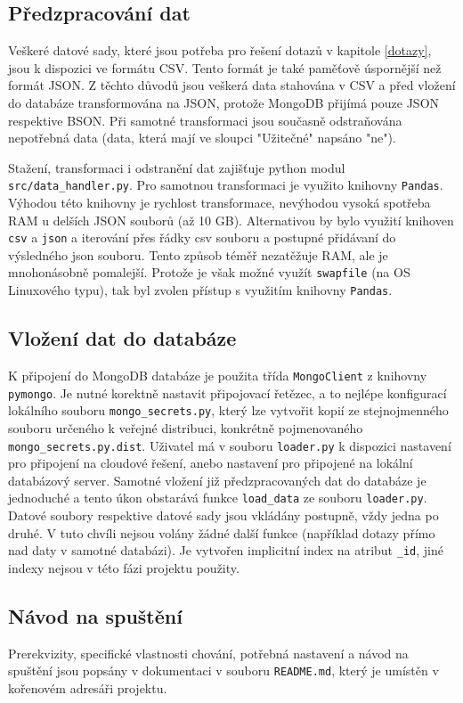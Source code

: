 \documentclass[12pt]{article}
\begin{document}
\subsection{Předzpracování dat}
\label{predzpracovani}
Veškeré datové sady, které jsou potřeba pro řešení dotazů v kapitole \ref{dotazy}, jsou k dispozici ve formátu CSV. Tento formát je také paměťově úspornější než formát JSON. Z těchto důvodů jsou veškerá data stahována v CSV a před vložení do databáze transformována na JSON, protože MongoDB přijímá pouze JSON respektive BSON. Při samotné transformaci jsou současně odstraňována nepotřebná data (data, která mají ve sloupci "Užitečné" napsáno "ne").

Stažení, transformaci i odstranění dat zajišťuje python modul \texttt{src/data\_handler.py}. Pro samotnou transformaci je využito knihovny \texttt{Pandas}. Výhodou této knihovny je rychlost transformace, nevýhodou vysoká spotřeba RAM u delších JSON souborů (až 10 GB). Alternativou by bylo využití knihoven \texttt{csv} a \texttt{json} a iterování přes řádky csv souboru a postupné přidávaní do výsledného json souboru. Tento způsob téměř nezatěžuje RAM, ale je mnohonásobně pomalejší. Protože je však možné využít \texttt{swapfile} (na OS Linuxového typu), tak byl zvolen přístup s využitím knihovny \texttt{Pandas}.

\subsection{Vložení dat do databáze}
K připojení do MongoDB databáze je použita třída \texttt{MongoClient} z knihovny \texttt{pymongo}. Je nutné korektně nastavit připojovací řetězec, a to nejlépe konfigurací lokálního souboru \texttt{mongo\_secrets.py}, který lze vytvořit kopií ze stejnojmenného souboru určeného k veřejné distribuci, konkrétně pojmenovaného \texttt{mongo\_secrets.py.dist}.
Uživatel má v souboru \texttt{loader.py} k dispozici nastavení pro připojení na cloudové řešení, anebo nastavení pro připojené na lokální databázový server.
Samotné vložení již předzpracovaných dat do databáze je jednoduché a tento úkon obstarává funkce \texttt{load\_data} ze souboru \texttt{loader.py}.
Datové soubory respektive datové sady jsou vkládány postupně, vždy jedna po druhé. V tuto chvíli nejsou volány žádné další funkce (například dotazy přímo nad daty v samotné databázi).
Je vytvořen implicitní index na atribut \texttt{\_id}, jiné indexy nejsou v této fázi projektu použity.

\subsection{Návod na spuštění}
Prerekvizity, specifické vlastnosti chování, potřebná nastavení a návod na spuštění jsou popsány v dokumentaci v souboru \texttt{README.md}, který je umístěn v kořenovém adresáři projektu.


%
%
\end{document}
